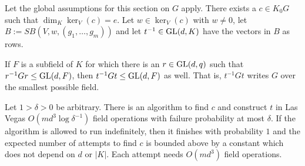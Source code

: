 



\begin{Theo}
\label{writing}
Let the global assumptions for this section on $G$ apply. 
There exists a $c \in K_0 G$ such that $\dim_K \ker_V(c) = e$.
Let $w \in \ker_V(c)$ with $w \neq 0$,  let $B := SB(V,w,(g_1, \ldots, g_m))$
and let $t^{-1} \in \GL(d,K)$ have the vectors in $B$ as rows.

If $F$ is a subfield of $K$ for which there is an $r \in \GL(d,q)$
such that $r^{-1}Gr \leq \GL(d,F)$, then $t^{-1}Gt \leq \GL(d,F)$ as well. 
That is, $t^{-1}Gt$ writes $G$ over the smallest possible field.

Let $1 > \delta > 0$ 
be arbitrary. There is an algorithm to find $c$ and construct $t$ in 
Las Vegas $O(md^3 \log \delta^{-1})$ field operations
with failure probability at most
$\delta$.
If the algorithm is allowed to run indefinitely, then it
finishes with probability $1$ and the expected number of attempts to find $c$
 is bounded above by a constant which does not depend on $d$ or $|K|$.
Each attempt needs $O(md^3)$ field operations.
\end{Theo}

